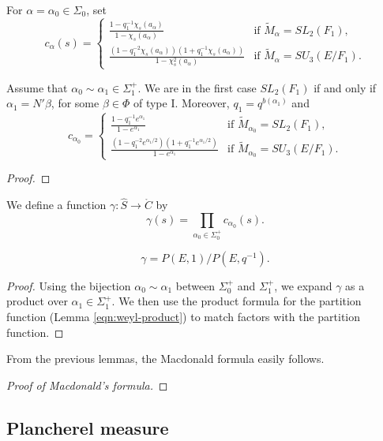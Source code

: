 For $\alpha=\alpha_0\in\Sigma_0$, set
\[
c_{\alpha}(s) = \begin{cases}
\frac{1 - q^{-1}_1 \chi_s (a_{\alpha})} {1 -\chi_s(a_{\alpha})} & \text{if } \tilde M_\alpha = SL_2(F_1),\\[1em]
\frac{(1 - q^{-2}_1 \chi_s (a_{\alpha}))(1+ q^{-1}_1 \chi_s(a_\alpha))} {1 -\chi^2_s(a_{\alpha})} & \text{if } \tilde M_\alpha = SU_3(E/F_1).
\end{cases}
\]

\begin{lemma}
Assume that $\alpha_0\sim\alpha_1\in\Sigma^+_1$.  
We are in the first case $SL_2(F_1)$ if and only if $\alpha_1=N'\beta$, for some $\beta\in\Phi$ of type I.
Moreover, $q_1 = q^{b(\alpha_1)}$ and
\[
c_{\alpha_0}  = 
\begin{cases}
\frac{1 - q^{-1}_1 e^{\alpha_1}} {1 -e^{\alpha_1}} & \text{if } \tilde M_{\alpha_0} = SL_2(F_1),\\[1em]
\frac{(1 - q^{-2}_1 e^{\alpha_1/2})(1+ q^{-1}_1 e^{\alpha_1/2})} {1 - e^{\alpha_1}} & \text{if } \tilde M_{\alpha_0} = SU_3(E/F_1).
\end{cases}
\]
\end{lemma}

\begin{proof}    
\end{proof}

We define a function $\gamma:\hat S\to \ring{C}$ by
\[
\gamma(s) = \prod_{\alpha_0\in \Sigma^+_0} c_{\alpha_0}(s).
\]

\begin{lemma}
\[
\gamma = P(E,1)/P(E,q^{-1}).
\]
\end{lemma}

\begin{proof} Using the bijection $\alpha_0\sim\alpha_1$ between $\Sigma^+_0$ and
$\Sigma^+_1$, we expand $\gamma$ as a product over $\alpha_1\in \Sigma^+_1$.
We then use the product formula for the partition function (Lemma \ref{eqn:weyl-product}) to
match factors with the partition function.
\end{proof}


From the previous lemmas, the Macdonald formula easily follows.

\begin{proof}[Proof of Macdonald's formula]
\end{proof}

\subsection{Plancherel measure}

